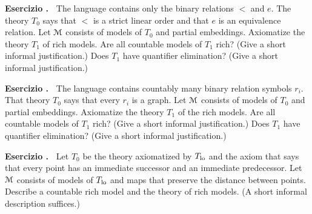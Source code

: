 \documentclass[10pt]{article}
\def\M{\EuScript M}
\newcounter{ex}
\newenvironment{exercise}{\bigskip\addtocounter{ex}{1}\textbf{Esercizio \theex.\ }}{}
\begin{document}
\begin{exercise}
  The language contains only the binary relations $<$ and $e$.
  The theory $T_0$ says that $<$ is a strict linear order and that $e$ is an equivalence relation.
  Let $\M$ consists of models of $T_0$ and partial embeddings.
  Axiomatize the theory $T_1$ of rich models.
  Are all countable models of $T_1$ rich? (Give a short informal justification.)
  Does $T_1$ have quantifier elimination? (Give a short informal justification.)
\end{exercise}

\begin{exercise}
  The language contains countably many binary relation symbols $r_i$.
  That theory $T_0$ says that every $r_i$ is a graph.
  Let $\M$ consists of models of $T_0$ and partial embeddings.
  Axiomatize the theory $T_1$ of the rich models.
  Are all countable models of $T_1$ rich? (Give a short informal justification.)
  Does $T_1$ have quantifier elimination? (Give a short informal justification.)
\end{exercise}

\begin{exercise}
  Let $T_0$ be the theory axiomatized by $T_{\rm lo}$ and the axiom that says that every point has an immediate successor and an immediate predecessor.
  Let $\M$ consists of models of $T_{\rm lo}$ and maps that preserve the distance between points.
  Describe a countable rich model and the theory of rich models. (A short informal description suffices.)
\end{exercise}
\end{document}
